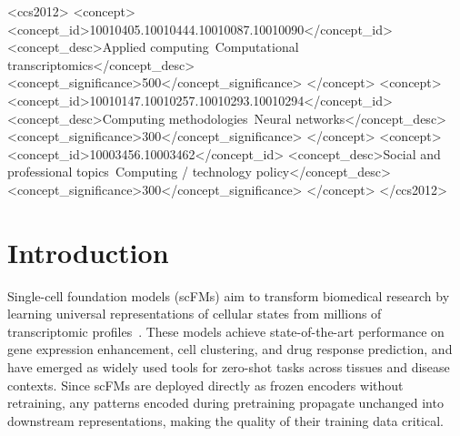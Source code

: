 \documentclass[sigconf]{acmart}
\begin{document}
\begin{CCSXML}
<ccs2012>
   <concept>
       <concept_id>10010405.10010444.10010087.10010090</concept_id>
       <concept_desc>Applied computing~Computational transcriptomics</concept_desc>
       <concept_significance>500</concept_significance>
   </concept>
   <concept>
       <concept_id>10010147.10010257.10010293.10010294</concept_id>
       <concept_desc>Computing methodologies~Neural networks</concept_desc>
       <concept_significance>300</concept_significance>
   </concept>
   <concept>
       <concept_id>10003456.10003462</concept_id>
       <concept_desc>Social and professional topics~Computing / technology policy</concept_desc>
       <concept_significance>300</concept_significance>
   </concept>
</ccs2012>
\end{CCSXML}




\maketitle

\section{Introduction}

Single-cell foundation models (scFMs) aim to transform biomedical research by learning universal representations of cellular states from millions of transcriptomic profiles~\cite{hao2024scfoundation,theodoris2023geneformer,cui2024scgpt}. These models achieve state-of-the-art performance on gene expression enhancement, cell clustering, and drug response prediction, and have emerged as widely used tools for zero-shot tasks across tissues and disease contexts. Since scFMs are deployed directly as frozen encoders without retraining, any patterns encoded during pretraining propagate unchanged into downstream representations, making the quality of their training data critical.
\end{document}
